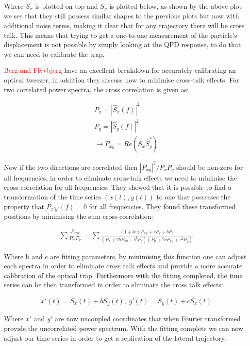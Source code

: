 Where $S_x$ is plotted on top and $S_y$ is plotted below, as shown by the above plot we see that they still possess similar shapes to the previous plots but now with additional noise terms, making it clear that for any trajectory there will be cross talk. This means that trying to get a one-to-one measurement of the particle's displacement is not possible by simply looking at the QPD response, to do that we can need to calibrate the trap. 

\textcolor{red}{Berg and Flyvbjerg} have an excellent breakdown for accurately calibrating an optical tweezer, in addition they discuss how to minimise cross-talk effects. For two correlated power spectra, the cross correlation is given as:

\begin{align}
	P_{x} = |\hat{S}_x(f)|^2 \\ 
	P_{y} = |\hat{S}_y(f)|^2 \\
	\rightarrow P_{xy} = Re(\hat{S}_x\hat{S}^*_y)
\end{align}

Now if the two directions are correlated then $|P_{xy}|^2/P_xP_y$  should be non-zero for all frequencies, in order to eliminate cross-talk effects we need to minimise the cross-correlation for all frequencies. They showed that it is possible to find a transformation of the time series $(x(t), y(t))$  to one that possesses the property that $P_{x'y'}(f)=0$ for all frequencies. They found these transformed positions by minimising the sum cross-correlation:

\begin{align}
	\sum\frac{P_{x'y'}}{P_{x'}P_{y'}} = \sum\frac{(1+bc)P_{xy}+cP_x+bP_y}{(P_x+2bP_{xy}+b^2P_y)(Py+2cP_{xy}+c^2P_y)}
\end{align}

Where b and c are fitting parameters, by minimising this function one can adjust each spectra in order to eliminate cross talk effects and provide a more accurate calibration of the optical trap. Furthermore with the fitting completed, the time series can be then transformed in order to eliminate the cross talk effects:

\begin{align}
	x'(t) = S_x(t) + bS_y(t),\ y'(t) = S_y(t) + cS_x(t)
\end{align}

Where $x'$ and $y'$ are now uncoupled coordinates that when Fourier transformed provide the uncorrelated power spectrum. With the fitting complete we can now adjust our time series in order to get a replication of the lateral trajectory. 

